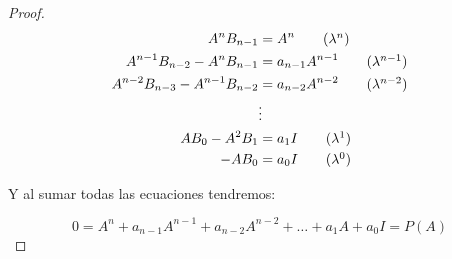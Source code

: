 \begin{proof}
		\begin{align*}
			A^n B_{n-1} & = A^n \tag{$\lambda^n$} \\
			A^{n-1} B_{n-2} - A^n B_{n-1} & = a_{n-1} A^{n-1} \tag{$\lambda^{n-1}$} \\
			A^{n-2} B_{n-3} - A^{n-1} B_{n-2} & = a_{n-2} A^{n-2} \tag{$\lambda^{n-2}$} \\
			& \vdots \\
			A B_0 - A^2 B_1 & = a_1 I \tag{$\lambda^1$} \\
			- A B_0 & = a_0 I \tag{$\lambda^0$}
		\end{align*}

		Y al sumar todas las ecuaciones tendremos:

		\begin{equation*}
			0 = A^n + a_{n-1} A^{n-1} + a_{n-2} A^{n-2} + \dots + a_1 A + a_0 I = P(A)
		\end{equation*}
	\end{proof}

